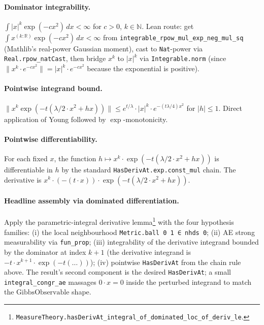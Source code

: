 \documentclass[11pt]{article}
\newcommand{\GO}{\mathrm{GibbsObservable}}
\begin{document}
\paragraph{Dominator integrability.}
\(\int |x|^k \exp(-c x^2)\,dx < \infty\) for \(c > 0\), \(k \in \mathbb{N}\).
Lean route: get
\(\int x^{(k:\mathbb{R})} \exp(-c x^2)\,dx < \infty\)
from \texttt{integrable\_rpow\_mul\_exp\_neg\_mul\_sq} (Mathlib's
real-power Gaussian moment), cast to \texttt{Nat}-power via
\texttt{Real.rpow\_natCast}, then bridge \(x^k\) to \(|x|^k\) via
\texttt{Integrable.norm} (since \(\|x^k \cdot e^{-cx^2}\| = |x|^k \cdot e^{-cx^2}\)
because the exponential is positive).

\paragraph{Pointwise integrand bound.}
\(\|x^k \exp(-t(\lambda/2 \cdot x^2 + h x))\|
\le e^{t/\lambda} \cdot |x|^k \cdot e^{-(t\lambda/4) x^2}\)
for \(|h| \le 1\). Direct application of Young followed by
\(\exp\)-monotonicity.

\paragraph{Pointwise differentiability.} For each fixed \(x\), the
function
\(h \mapsto x^k \cdot \exp(-t(\lambda/2 \cdot x^2 + h x))\)
is differentiable in \(h\) by the standard
\texttt{HasDerivAt.exp.const\_mul} chain. The derivative is
\(x^k \cdot (-(t \cdot x)) \cdot \exp(-t(\lambda/2 \cdot x^2 + h x))\).

\paragraph{Headline assembly via dominated differentiation.} Apply the
parametric-integral derivative
lemma\footnote{\texttt{MeasureTheory.hasDerivAt\_integral\_of\_dominated\_loc\_of\_deriv\_le}.}
with the four hypothesis families:
(i) the local neighbourhood
\texttt{Metric.ball 0 1 ∈ nhds 0};
(ii) AE strong measurability via \texttt{fun\_prop};
(iii) integrability of the derivative integrand bounded by the
dominator at index \(k+1\) (the derivative integrand is
\(-t \cdot x^{k+1} \cdot \exp(-t(\ldots))\));
(iv) pointwise \texttt{HasDerivAt} from the chain rule above.
The result's second component is the desired \texttt{HasDerivAt}; a
small \texttt{integral\_congr\_ae} massages \(0 \cdot x = 0\) inside
the perturbed integrand to match the \(\GO\) shape.
\end{document}

